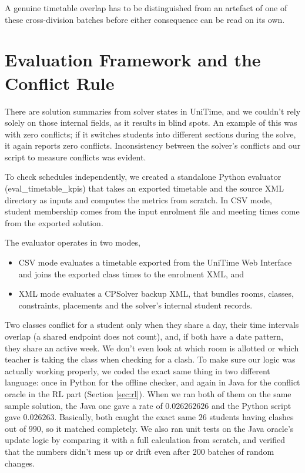 \documentclass[journal]{IEEEtran}
\begin{document}
A genuine timetable overlap has to be distinguished from an artefact of one of these cross-division batches before either consequence can be read on its own.
\section{Evaluation Framework and the Conflict Rule}

\label{sec:evaluator}

There are solution summaries from solver states in UniTime, and we couldn't rely solely on those internal fields, as it results in blind spots. An example of this was with zero conflicts; if it switches students into different sections during the solve, it again reports zero conflicts. Inconsistency between the solver's conflicts and our script to measure conflicts was evident.

To check schedules independently, we created a standalone Python evaluator (eval\_timetable\_kpis) that takes an exported timetable and the source XML directory as inputs and computes the metrics from scratch. In CSV mode, student membership comes from the input enrolment file and meeting times come from the exported solution.

The evaluator operates in two modes,
\begin{itemize}
  \item CSV mode evaluates a timetable exported from the UniTime Web Interface and joins the exported class times to the enrolment XML, and
  \item XML mode evaluates a CPSolver backup XML, that bundles rooms, classes, constraints, placements and the solver’s internal student records.
\end{itemize}

Two classes conflict for a student only when they share a day, their time intervals overlap (a shared endpoint does not count), and, if both have a date pattern, they share an active week. We don't even look at which room is allotted or which teacher is taking the class when checking for a clash. To make sure our logic was actually working properly, we coded the exact same thing in two different language: once in Python for the offline checker, and again in Java for the conflict oracle in the RL part (Section \ref{sec:rl}). When we ran both of them on the same sample solution, the Java one gave a rate of $0.026262626$ and the Python script gave $0.026263$. Basically, both caught the exact same $26$ students having clashes out of $990$, so it matched completely. We also ran unit tests on the Java oracle's update logic by comparing it with a full calculation from scratch, and verified that the numbers didn't mess up or drift even after $200$ batches of random changes.
\end{document}
